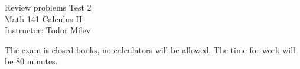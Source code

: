 \documentclass{article}
\begin{document}
\begin{center}
\Large
Review problems Test 2\\ Math 141 Calculus II \\ \normalsize Instructor: Todor Milev
\end{center}


\noindent The exam is closed books, no calculators will be allowed. The time for work will be 80 minutes. %
\end{document}
